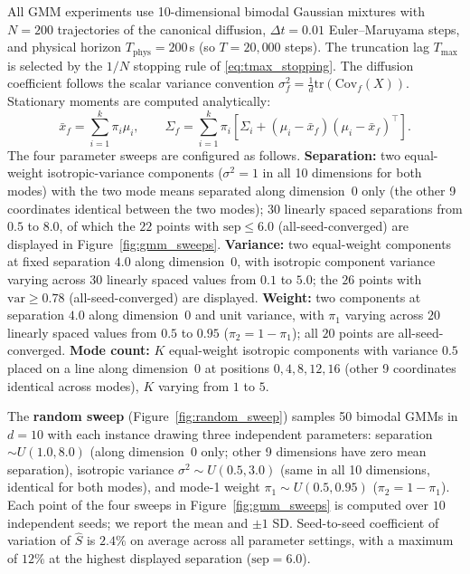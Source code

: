 \documentclass{article}
\newcommand{\Cov}{\mathrm{Cov}}
\newcommand{\tr}{\mathrm{tr}}
\begin{document}
All GMM experiments use 10-dimensional bimodal Gaussian mixtures with
$N = 200$ trajectories of the canonical diffusion, $\Delta t = 0.01$
Euler--Maruyama steps, and physical horizon $T_{\mathrm{phys}} = 200$\,s
(so $T = 20{,}000$ steps). The truncation lag $T_{\max}$ is selected by
the $1/N$ stopping rule of \eqref{eq:tmax_stopping}. The diffusion
coefficient follows the scalar variance convention
$\sigma_f^2 = \frac{1}{d}\tr(\Cov_f(X))$. Stationary moments are
computed analytically:
\[
\bar x_f = \sum_{i=1}^{k} \pi_i \mu_i, \qquad
\Sigma_f = \sum_{i=1}^{k} \pi_i \left[\Sigma_i + (\mu_i - \bar x_f)(\mu_i - \bar x_f)^\top\right].
\]
The four parameter sweeps are configured as follows.
\textbf{Separation:} two equal-weight isotropic-variance components
($\sigma^2 = 1$ in all 10 dimensions for both modes) with the two mode
means separated along dimension~0 only (the other 9 coordinates
identical between the two modes); $30$ linearly spaced separations
from $0.5$ to $8.0$, of which the $22$ points with $\mathrm{sep} \le 6.0$
(all-seed-converged) are displayed in Figure~\ref{fig:gmm_sweeps}.
\textbf{Variance:} two equal-weight components at fixed separation
$4.0$ along dimension~0, with isotropic component variance varying
across $30$ linearly spaced values from $0.1$ to $5.0$; the $26$ points
with $\mathrm{var} \ge 0.78$ (all-seed-converged) are displayed.
\textbf{Weight:} two components at separation $4.0$ along dimension~0
and unit variance, with $\pi_1$ varying across $20$ linearly spaced
values from $0.5$ to $0.95$ ($\pi_2 = 1 - \pi_1$); all $20$ points are
all-seed-converged. \textbf{Mode count:} $K$ equal-weight isotropic
components with variance $0.5$ placed on a line along dimension~0 at
positions $0, 4, 8, 12, 16$ (other 9 coordinates identical across
modes), $K$ varying from $1$ to $5$.

The \textbf{random sweep} (Figure~\ref{fig:random_sweep}) samples 50
bimodal GMMs in $d = 10$ with each instance drawing three independent
parameters: separation $\sim U(1.0, 8.0)$ (along dimension~0 only;
other 9 dimensions have zero mean separation), isotropic variance
$\sigma^2 \sim U(0.5, 3.0)$ (same in all 10 dimensions, identical for
both modes), and mode-1 weight $\pi_1 \sim U(0.5, 0.95)$
($\pi_2 = 1 - \pi_1$). Each point of the four sweeps in
Figure~\ref{fig:gmm_sweeps} is computed over $10$ independent seeds; we
report the mean and $\pm 1$ SD. Seed-to-seed coefficient of variation
of $\hat S$ is $2.4\%$ on average across all parameter settings, with
a maximum of $12\%$ at the highest displayed separation
($\mathrm{sep} = 6.0$).
\end{document}
